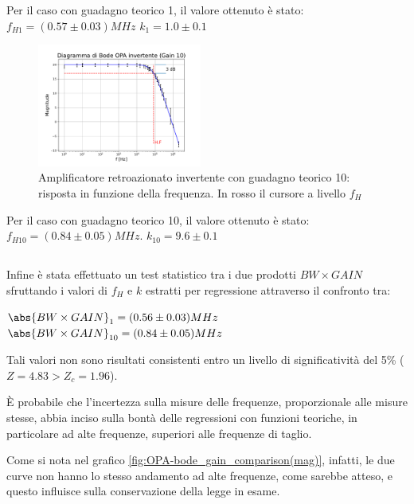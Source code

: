 \documentclass[journal]{IEEEtran}
\begin{document}
Per il caso con guadagno teorico 1, il valore ottenuto è stato:
$f_{H1} = (0.57 \pm 0.03) MHz$
$k_1 = 1.0 \pm 0.1$

\begin{figure}[H]%
\begin {center}
\includegraphics[width=0.48\textwidth]{analysis/output/OPA-bode_gain10(mag).pdf}
\caption{Amplificatore retroazionato invertente con guadagno teorico 10: risposta in funzione della frequenza. In rosso il cursore a livello $f_H$ }
\label{fig:closed_loop_inv_gain_10}
\end {center}
\end{figure}


Per il caso con guadagno teorico 10, il valore ottenuto è stato:
$f_{H10} = (0.84 \pm 0.05) MHz$.
$k_{10} = 9.6 \pm 0.1$

\subsection{}

Infine è stata effettuato un test statistico tra i due prodotti $BW \times GAIN$ sfruttando i valori di $f_H$ e $k$ estratti per regressione attraverso il confronto tra:

$\abs{BW \times GAIN}_1 = (0.56 \pm 0.03) MHz$
$\abs{BW \times GAIN}_{10} = (0.84 \pm 0.05) MHz$


Tali valori non sono risultati consistenti entro un livello di significatività del 5\% ($Z = 4.83 > Z_c = 1.96$). 

È probabile che l'incertezza sulla misure delle frequenze, proporzionale alle misure stesse, abbia inciso sulla bontà delle regressioni con funzioni teoriche, in particolare ad alte frequenze, superiori alle frequenze di taglio.

Come si nota nel grafico \ref{fig:OPA-bode_gain_comparison(mag)}, infatti, le due curve non hanno lo stesso andamento ad alte frequenze, come sarebbe atteso, e questo influisce sulla conservazione della legge in esame. 
\end{document}

